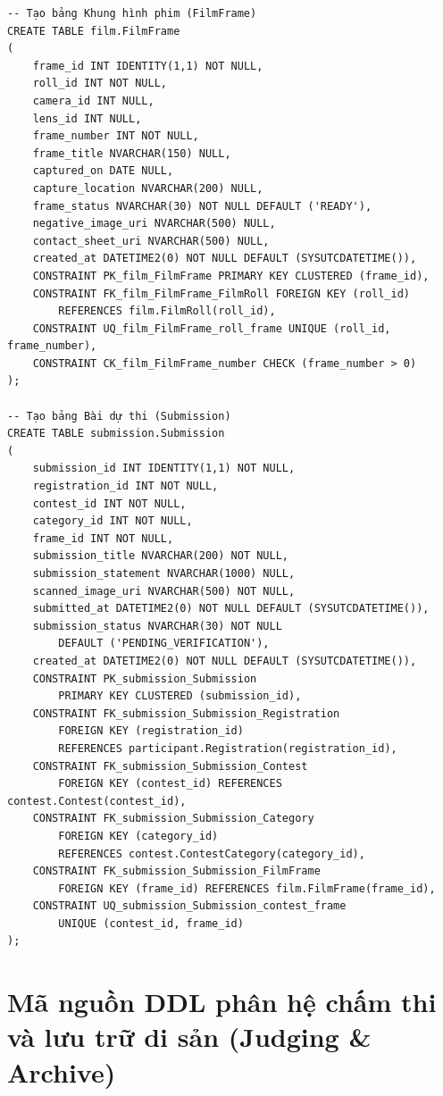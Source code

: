 \begin{verbatim}
-- Tạo bảng Khung hình phim (FilmFrame)
CREATE TABLE film.FilmFrame
(
    frame_id INT IDENTITY(1,1) NOT NULL,
    roll_id INT NOT NULL,
    camera_id INT NULL,
    lens_id INT NULL,
    frame_number INT NOT NULL,
    frame_title NVARCHAR(150) NULL,
    captured_on DATE NULL,
    capture_location NVARCHAR(200) NULL,
    frame_status NVARCHAR(30) NOT NULL DEFAULT ('READY'),
    negative_image_uri NVARCHAR(500) NULL,
    contact_sheet_uri NVARCHAR(500) NULL,
    created_at DATETIME2(0) NOT NULL DEFAULT (SYSUTCDATETIME()),
    CONSTRAINT PK_film_FilmFrame PRIMARY KEY CLUSTERED (frame_id),
    CONSTRAINT FK_film_FilmFrame_FilmRoll FOREIGN KEY (roll_id) 
        REFERENCES film.FilmRoll(roll_id),
    CONSTRAINT UQ_film_FilmFrame_roll_frame UNIQUE (roll_id, frame_number),
    CONSTRAINT CK_film_FilmFrame_number CHECK (frame_number > 0)
);

-- Tạo bảng Bài dự thi (Submission)
CREATE TABLE submission.Submission
(
    submission_id INT IDENTITY(1,1) NOT NULL,
    registration_id INT NOT NULL,
    contest_id INT NOT NULL,
    category_id INT NOT NULL,
    frame_id INT NOT NULL,
    submission_title NVARCHAR(200) NOT NULL,
    submission_statement NVARCHAR(1000) NULL,
    scanned_image_uri NVARCHAR(500) NOT NULL,
    submitted_at DATETIME2(0) NOT NULL DEFAULT (SYSUTCDATETIME()),
    submission_status NVARCHAR(30) NOT NULL 
        DEFAULT ('PENDING_VERIFICATION'),
    created_at DATETIME2(0) NOT NULL DEFAULT (SYSUTCDATETIME()),
    CONSTRAINT PK_submission_Submission 
        PRIMARY KEY CLUSTERED (submission_id),
    CONSTRAINT FK_submission_Submission_Registration 
        FOREIGN KEY (registration_id) 
        REFERENCES participant.Registration(registration_id),
    CONSTRAINT FK_submission_Submission_Contest 
        FOREIGN KEY (contest_id) REFERENCES contest.Contest(contest_id),
    CONSTRAINT FK_submission_Submission_Category 
        FOREIGN KEY (category_id) 
        REFERENCES contest.ContestCategory(category_id),
    CONSTRAINT FK_submission_Submission_FilmFrame 
        FOREIGN KEY (frame_id) REFERENCES film.FilmFrame(frame_id),
    CONSTRAINT UQ_submission_Submission_contest_frame 
        UNIQUE (contest_id, frame_id)
);
\end{verbatim}

\section{Mã nguồn DDL phân hệ chấm thi và lưu trữ di sản (Judging \& Archive)}
\label{a:ddl_judging_archive}

